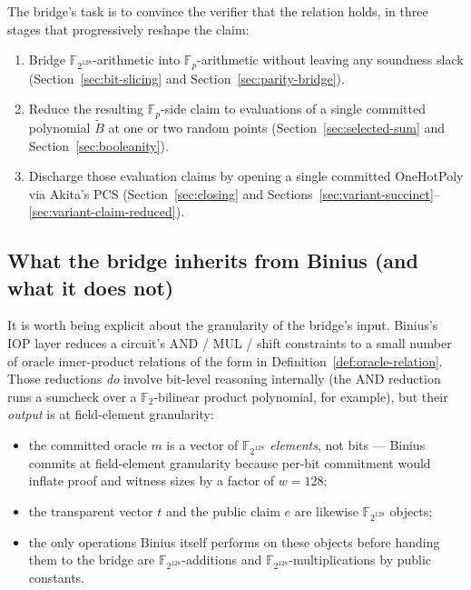 \documentclass[11pt,a4paper]{article}
\theoremstyle{definition}
\theoremstyle{remark}
\newcommand{\binF}{\mathbb{F}_{2^{128}}}        %
\newcommand{\akF}{\mathbb{F}_{p}}                %
\newcommand{\GF}[1]{\mathbb{F}_{#1}}             %
\newcommand{\MLE}[1]{\widetilde{#1}}              %
\newcommand{\BitTable}{B}                         %
\newcommand{\Transparent}{t}                      %
\newcommand{\Message}{m}                          %
\begin{document}
The bridge's task is to convince the verifier that the relation holds,
in three stages that progressively reshape the claim:

\begin{enumerate}[leftmargin=*, itemsep=2pt]
  \item[\textbf{Stage A.}] Bridge $\binF$-arithmetic into
        $\akF$-arithmetic without leaving any soundness slack
        (Section~\ref{sec:bit-slicing} and
        Section~\ref{sec:parity-bridge}).
  \item[\textbf{Stage B.}] Reduce the resulting $\akF$-side claim to
        evaluations of a single committed polynomial $\MLE{\BitTable}$
        at one or two random points
        (Section~\ref{sec:selected-sum} and
        Section~\ref{sec:booleanity}).
  \item[\textbf{Stage C.}] Discharge those evaluation claims by opening
        a single committed OneHotPoly via Akita's PCS
        (Section~\ref{sec:closing} and
        Sections~\ref{sec:variant-succinct}--\ref{sec:variant-claim-reduced}).
\end{enumerate}

\subsection{What the bridge inherits from Binius (and what it does not)}
\label{sec:inherits-from-binius}

It is worth being explicit about the granularity of the bridge's
input. Binius's IOP layer reduces a circuit's AND / MUL / shift
constraints to a small number of oracle inner-product relations of the
form in Definition~\ref{def:oracle-relation}. Those reductions
\emph{do} involve bit-level reasoning internally (the AND reduction
runs a sumcheck over a $\GF{2}$-bilinear product polynomial, for
example), but their \emph{output} is at field-element granularity:

\begin{itemize}[leftmargin=*, itemsep=2pt]
  \item the committed oracle $\Message$ is a vector of \emph{$\binF$
        elements}, not bits — Binius commits at field-element
        granularity because per-bit commitment would inflate proof and
        witness sizes by a factor of $w = 128$;
  \item the transparent vector $\Transparent$ and the public claim $e$
        are likewise $\binF$ objects;
  \item the only operations Binius itself performs on these objects
        before handing them to the bridge are $\binF$-additions and
        $\binF$-multiplications by public constants.
\end{itemize}
\end{document}
